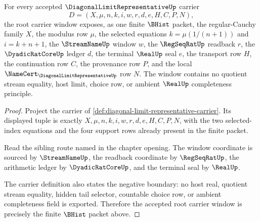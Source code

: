 \begin{theorem}
\label{thm:diagonal-limit-representative-root-carrier-window}
For every accepted $\DiagonalLimitRepresentativeUp$ carrier
$$
D=(X,\mu,n,k,i,w,r,d,e,H,C,P,N),
$$
the root carrier window exposes, as one finite $\BHist$ packet, the regular-Cauchy family $X$, the modulus row $\mu$, the selected equations $k=\mu(1/(n+1))$ and $i=k+n+1$, the $\StreamNameUp$ window $w$, the $\RegSeqRatUp$ readback $r$, the $\DyadicRatCoreUp$ ledger $d$, the terminal $\RealUp$ seal $e$, the transport row $H$, the continuation row $C$, the provenance row $P$, and the local $\NameCert_{\DiagonalLimitRepresentativeUp}$ row $N$. The window contains no quotient stream equality, host limit, choice row, or ambient $\RealUp$ completeness principle.
\end{theorem}
\begin{proof}
Project the carrier of \autoref{def:diagonal-limit-representative-carrier}. Its displayed tuple is exactly $X,\mu,n,k,i,w,r,d,e,H,C,P,N$, with the two selected-index equations and the four support rows already present in the finite packet.

Read the sibling route named in the chapter opening. The window coordinate is sourced by $\StreamNameUp$, the readback coordinate by $\RegSeqRatUp$, the arithmetic ledger by $\DyadicRatCoreUp$, and the terminal seal by $\RealUp$.

The carrier definition also states the negative boundary: no host real, quotient stream equality, hidden tail selector, countable choice row, or ambient completeness field is exported. Therefore the accepted root carrier window is precisely the finite $\BHist$ packet above.
\end{proof}

